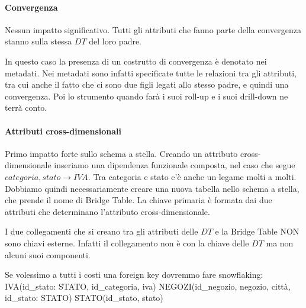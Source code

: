 \paragraph{Convergenza}
Nessun impatto significativo. Tutti gli attributi che fanno parte della convergenza stanno sulla stessa $DT$ del loro padre.
\begin{info}
	In questo caso la presenza di un costrutto di convergenza è denotato nei metadati. Nei metadati sono infatti specificate tutte le relazioni tra gli attributi, tra cui anche il fatto che ci sono due figli legati allo stesso padre, e quindi una convergenza. Poi lo strumento quando farà i suoi roll-up e i suoi drill-down ne terrà conto.
\end{info}
\paragraph{Attributi cross-dimensionali}
Primo impatto forte sullo schema a stella. Creando un attributo cross-dimensionale inseriamo una dipendenza funzionale composta, nel caso che segue $ categoria, stato \xrightarrow{} IVA$.
Tra categoria e stato c'è anche un legame molti a molti. Dobbiamo quindi necessariamente creare una nuova tabella nello schema a stella, che prende il nome di Bridge Table. La chiave primaria è formata dai due attributi che determinano l'attributo cross-dimensionale.
\begin{warn}
	I due collegamenti che si creano tra gli attributi delle $DT$ e la Bridge Table NON sono chiavi esterne. Infatti il collegamento non è con la chiave delle $DT$ ma non alcuni suoi componenti.
\end{warn}
Se volessimo a tutti i costi una foreign key dovremmo fare snowflaking:\newline\newline
IVA(id\_stato: STATO, id\_categoria, iva)\newline
NEGOZI(id\_negozio, negozio, città, id\_stato: STATO)\newline
STATO(id\_stato, stato)\newline
